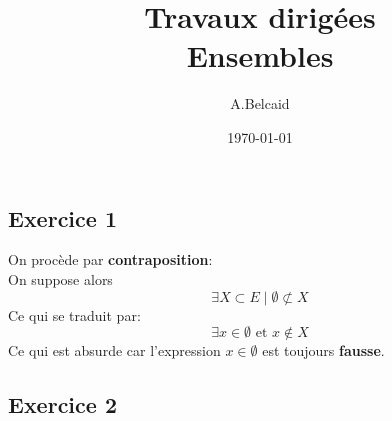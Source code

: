 \documentclass{report}
\title{\Huge{Travaux dirigées}\\ Ensembles}
\author{\huge{A.Belcaid}}
\date{\today}
\begin{document}
\maketitle
\newpage%
\tableofcontents
\pagebreak

\chapter{}
\section{Exercice 1}

\begin{myproof}
  On procède par  \textbf{contraposition}: \\

  On suppose alors 
  $$
  \exists X \subset E\; |\; \emptyset \not \subset X
  $$
  Ce qui se traduit par:
  $$
  \exists x \in \emptyset \text{ et } x \not\in X
  $$
  Ce qui est absurde car l'expression $ x \in \emptyset$ est toujours
  \textbf{fausse}.

\end{myproof}



\section{Exercice 2}
\end{document}
